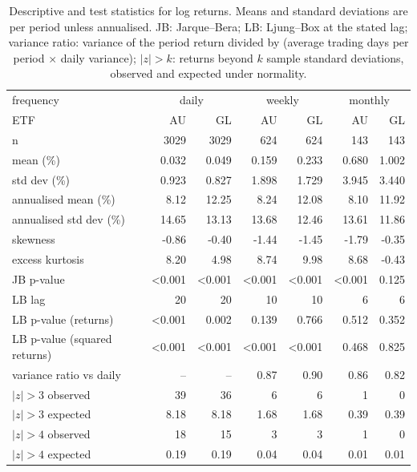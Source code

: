 \begin{table}
\caption{Descriptive and test statistics for log returns. Means and standard deviations are per period unless annualised. JB: Jarque--Bera; LB: Ljung--Box at the stated lag; variance ratio: variance of the period return divided by (average trading days per period $\times$ daily variance); $|z|>k$: returns beyond $k$ sample standard deviations, observed and expected under normality.}
\label{tab:diagnostics}
\begin{tabular}{lrrrrrr}
\toprule
frequency & \multicolumn{2}{c}{daily} & \multicolumn{2}{c}{weekly} & \multicolumn{2}{c}{monthly} \\
ETF & AU & GL & AU & GL & AU & GL \\
\midrule
n & 3029 & 3029 & 624 & 624 & 143 & 143 \\
mean (\%) & 0.032 & 0.049 & 0.159 & 0.233 & 0.680 & 1.002 \\
std dev (\%) & 0.923 & 0.827 & 1.898 & 1.729 & 3.945 & 3.440 \\
annualised mean (\%) & 8.12 & 12.25 & 8.24 & 12.08 & 8.10 & 11.92 \\
annualised std dev (\%) & 14.65 & 13.13 & 13.68 & 12.46 & 13.61 & 11.86 \\
skewness & -0.86 & -0.40 & -1.44 & -1.45 & -1.79 & -0.35 \\
excess kurtosis & 8.20 & 4.98 & 8.74 & 9.98 & 8.68 & -0.43 \\
JB p-value & <0.001 & <0.001 & <0.001 & <0.001 & <0.001 & 0.125 \\
LB lag & 20 & 20 & 10 & 10 & 6 & 6 \\
LB p-value (returns) & <0.001 & 0.002 & 0.139 & 0.766 & 0.512 & 0.352 \\
LB p-value (squared returns) & <0.001 & <0.001 & <0.001 & <0.001 & 0.468 & 0.825 \\
variance ratio vs daily & -- & -- & 0.87 & 0.90 & 0.86 & 0.82 \\
$|z|>3$ observed & 39 & 36 & 6 & 6 & 1 & 0 \\
$|z|>3$ expected & 8.18 & 8.18 & 1.68 & 1.68 & 0.39 & 0.39 \\
$|z|>4$ observed & 18 & 15 & 3 & 3 & 1 & 0 \\
$|z|>4$ expected & 0.19 & 0.19 & 0.04 & 0.04 & 0.01 & 0.01 \\
\bottomrule
\end{tabular}
\end{table}

